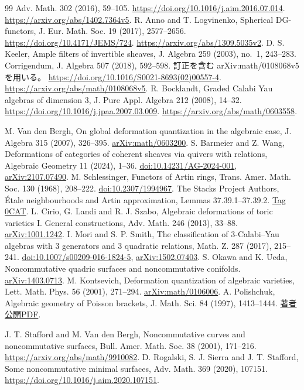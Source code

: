 \documentclass[11pt,a4paper]{ltjsarticle}
\theoremstyle{definition}
\begin{document}
\begin{thebibliography}{99}
Adv. Math. 302 (2016), 59--105.
\url{https://doi.org/10.1016/j.aim.2016.07.014}.
\url{https://arxiv.org/abs/1402.7364v5}.
 R. Anno and T. Logvinenko,
Spherical DG-functors,
J. Eur. Math. Soc. 19 (2017), 2577--2656.
\url{https://doi.org/10.4171/JEMS/724}.
\url{https://arxiv.org/abs/1309.5035v2}.
 D. S. Keeler,
Ample filters of invertible sheaves,
J. Algebra 259 (2003), no.~1, 243--283.
Corrigendum, J. Algebra 507 (2018), 592--598.
訂正を含む arXiv:math/0108068v5 を用いる。
\url{https://doi.org/10.1016/S0021-8693(02)00557-4}.
\url{https://arxiv.org/abs/math/0108068v5}.
 R. Bocklandt,
Graded Calabi Yau algebras of dimension 3,
J. Pure Appl. Algebra 212 (2008), 14--32.
\url{https://doi.org/10.1016/j.jpaa.2007.03.009}.
\url{https://arxiv.org/abs/math/0603558}.

 M. Van den Bergh,
On global deformation quantization in the algebraic case,
J. Algebra 315 (2007), 326--395.
\href{https://arxiv.org/abs/math/0603200}{arXiv:math/0603200}.
 S. Barmeier and Z. Wang,
Deformations of categories of coherent sheaves via quivers with relations,
Algebraic Geometry 11 (2024), 1--36.
\href{https://doi.org/10.14231/AG-2024-001}{doi:10.14231/AG-2024-001},
\href{https://arxiv.org/abs/2107.07490}{arXiv:2107.07490}.
 M. Schlessinger,
Functors of Artin rings, Trans. Amer. Math. Soc. 130 (1968), 208--222.
\href{https://doi.org/10.2307/1994967}{doi:10.2307/1994967}.
 The Stacks Project Authors,
\'Etale neighbourhoods and Artin approximation, Lemmas 37.39.1--37.39.2.
\href{https://stacks.math.columbia.edu/tag/0CAT}{Tag 0CAT}.
 L. Cirio, G. Landi and R. J. Szabo,
Algebraic deformations of toric varieties I. General constructions,
Adv. Math. 246 (2013), 33--88.
\href{https://arxiv.org/abs/1001.1242}{arXiv:1001.1242}.
 I. Mori and S. P. Smith,
The classification of 3-Calabi--Yau algebras with 3 generators and 3 quadratic relations,
Math. Z. 287 (2017), 215--241.
\href{https://doi.org/10.1007/s00209-016-1824-5}{doi:10.1007/s00209-016-1824-5},
\href{https://arxiv.org/abs/1502.07403}{arXiv:1502.07403}.
 S. Okawa and K. Ueda,
Noncommutative quadric surfaces and noncommutative conifolds.
\href{https://arxiv.org/abs/1403.0713}{arXiv:1403.0713}.
 M. Kontsevich,
Deformation quantization of algebraic varieties,
Lett. Math. Phys. 56 (2001), 271--294.
\href{https://arxiv.org/abs/math/0106006}{arXiv:math/0106006}.
 A. Polishchuk, Algebraic geometry of Poisson brackets,
J. Math. Sci. 84 (1997), 1413--1444.
\href{https://pages.uoregon.edu/apolish/alg-geom-poisson.pdf}{著者公開PDF}.

 J. T. Stafford and M. Van den Bergh,
Noncommutative curves and noncommutative surfaces,
Bull. Amer. Math. Soc. 38 (2001), 171--216.
\url{https://arxiv.org/abs/math/9910082}.
 D. Rogalski, S. J. Sierra and J. T. Stafford,
Some noncommutative minimal surfaces,
Adv. Math. 369 (2020), 107151.
\url{https://doi.org/10.1016/j.aim.2020.107151}.
\end{thebibliography}
\end{document}
